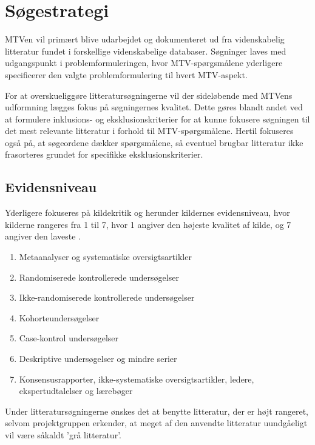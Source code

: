 \chapter{Søgestrategi}\label{sec:metode_soeg}

MTVen vil primært blive udarbejdet og dokumenteret ud fra videnskabelig litteratur fundet i forskellige videnskabelige databaser. Søgninger laves med udgangspunkt i problemformuleringen, hvor MTV-spørgsmålene yderligere specificerer den valgte problemformulering til hvert MTV-aspekt. 

For at overskueliggøre litteratursøgningerne vil der sideløbende med MTVens udformning lægges fokus på søgningernes kvalitet. Dette gøres blandt andet ved at formulere inklusions- og eksklusionskriterier for at kunne fokusere søgningen til det mest relevante litteratur i forhold til MTV-spørgsmålene. Hertil fokuseres også på, at søgeordene dækker spørgsmålene, så eventuel brugbar litteratur ikke frasorteres grundet for specifikke eksklusionskriterier. 

\section{Evidensniveau} \label{sec:met_evidens}

Yderligere fokuseres på kildekritik og herunder kildernes evidensniveau, hvor kilderne rangeres fra 1 til 7, hvor 1 angiver den højeste kvalitet af kilde, og 7 angiver den laveste \citep{mtvhaandbog}.  

\begin{enumerate}
\item Metaanalyser og systematiske oversigtsartikler
\item Randomiserede kontrollerede undersøgelser
\item Ikke-randomiserede kontrollerede undersøgelser
\item Kohorteundersøgelser
\item Case-kontrol undersøgelser
\item Deskriptive undersøgelser og mindre serier
\item Konsensusrapporter, ikke-systematiske oversigtsartikler, ledere, ekspertudtalelser og lærebøger
\end{enumerate}

\noindent
Under litteratursøgningerne ønskes det at benytte litteratur, der er højt rangeret, selvom projektgruppen erkender, at meget af den anvendte litteratur uundgåeligt vil være såkaldt 'grå litteratur'. 
